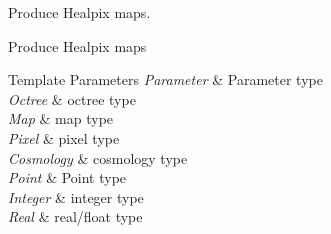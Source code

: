 Produce Healpix maps. 

Produce Healpix maps 
\begin{DoxyTemplParams}{Template Parameters}
{\em Parameter} & Parameter type \\
\hline
{\em Octree} & octree type \\
\hline
{\em Map} & map type \\
\hline
{\em Pixel} & pixel type \\
\hline
{\em Cosmology} & cosmology type \\
\hline
{\em Point} & Point type \\
\hline
{\em Integer} & integer type \\
\hline
{\em Real} & real/float type \\
\hline
\end{DoxyTemplParams}

